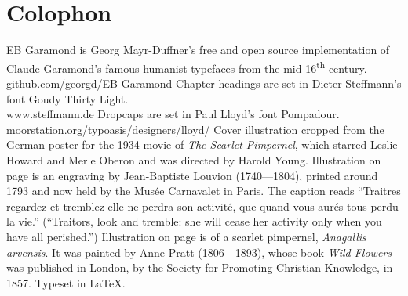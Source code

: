 \documentclass[paper=5.5in:8.5in,BCOR=7mm,twoside,DIV=calc,12pt,usegeometry,chapterprefix,endperiod,headings=big]{scrbook}
\begin{document}
\chapter*{Colophon}

\centering
EB Garamond is Georg Mayr-Duffner's free and open source implementation of Claude Garamond's famous humanist typefaces from the mid-16\textsuperscript{th} century. \\github.com/georgd/EB-Garamond
\vfill
Chapter headings are set in Dieter Steffmann's font Goudy Thirty Light.\\www.steffmann.de
\vfill
Dropcaps are set in Paul Lloyd's font Pompadour.\\moorstation.org/typoasis/designers/lloyd/
\vfill
Cover illustration cropped from the German poster for the 1934 movie of \textit{The Scarlet Pimpernel}, which starred Leslie Howard and Merle Oberon and was directed by Harold Young.
\vfill
Illustration on page \pageref{guillotine} is an engraving by Jean-Baptiste Louvion (1740---1804), printed around 1793 and now held by the Musée Carnavalet in Paris. The caption reads \enquote{Traitres regardez et tremblez elle ne perdra son activité, que quand vous aurés tous perdu la vie.} (\enquote{Traitors, look and tremble: she will cease her activity only when you have all perished.})
\vfill
Illustration on page \pageref{flowers} is of a scarlet pimpernel, \textit{Anagallis arvensis}. It was painted by Anne Pratt (1806---1893), whose book \textit{Wild Flowers} was published in London, by the Society for Promoting Christian Knowledge, in 1857. 
\vfill
Typeset in \LaTeX{}.
\thispagestyle{empty}
\end{document}
